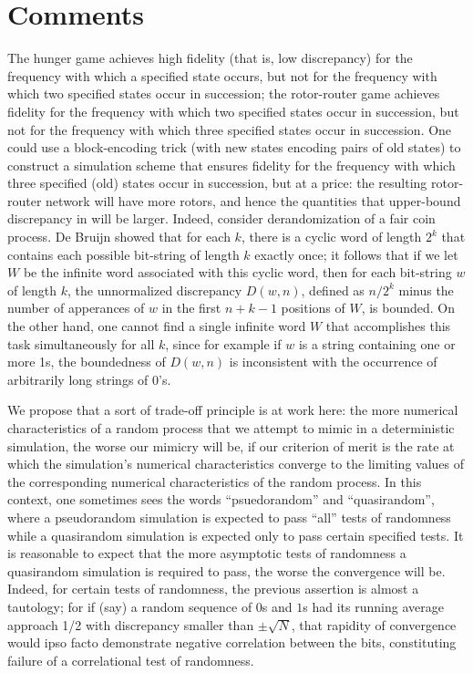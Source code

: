 \section{Comments}\label{section: conclusion}
The hunger game achieves high fidelity (that is, low discrepancy)
for the frequency with which a specified state occurs,
but not for the frequency with which two specified states occur in succession;
the rotor-router game achieves fidelity for the frequency with which
two specified states occur in succession, but not for the frequency 
with which three specified states occur in succession.
One could use a block-encoding trick
(with new states encoding pairs of old states) 
to construct a simulation scheme that
ensures fidelity for the frequency with which
three specified (old) states occur in succession, but at a price:
the resulting rotor-router network will have more rotors,
and hence the quantities that upper-bound discrepancy
in \cite{holroyd2010rotor} will be larger.
Indeed, consider derandomization of a fair coin process.
De Bruijn \cite{debruijn1946} showed that 
for each $k$, there is a cyclic word of length $2^k$
that contains each possible bit-string of length $k$ exactly once;
it follows that if we let $W$ be 
the infinite word associated with this cyclic word,
then for each bit-string $w$ of length $k$,
the unnormalized discrepancy $D(w,n)$,
defined as $n/2^k$ minus the number of apperances of $w$
in the first $n+k-1$ positions of $W$, is bounded.
On the other hand, one cannot find a single infinite word $W$
that accomplishes this task simultaneously for all $k$,
since for example if $w$ is a string containing one or more 1s,
the boundedness of $D(w,n)$
is inconsistent with the occurrence of arbitrarily long strings of 0's.

We propose that a sort of trade-off principle is at work here: 
the more numerical characteristics of a random process
that we attempt to mimic in a deterministic simulation,
the worse our mimicry will be, if our criterion of merit is the rate at which
the simulation's numerical characteristics converge to the limiting values 
of the corresponding numerical characteristics of the random process.
In this context, one sometimes sees the words
``psuedorandom'' and ``quasirandom'',
where a pseudorandom simulation is expected to pass ``all'' tests of randomness
while a quasirandom simulation is expected only to pass certain specified tests.
It is reasonable to expect that the more asymptotic tests of randomness
a quasirandom simulation is required to pass,
the worse the convergence will be.
Indeed, for certain tests of randomness,
the previous assertion is almost a tautology;
for if (say) a random sequence of $0$s and $1$s
had its running average approach 1/2 with discrepancy smaller than $\pm \sqrt{N}$,
that rapidity of convergence would ipso facto
demonstrate negative correlation between the bits,
constituting failure of a correlational test of randomness.

